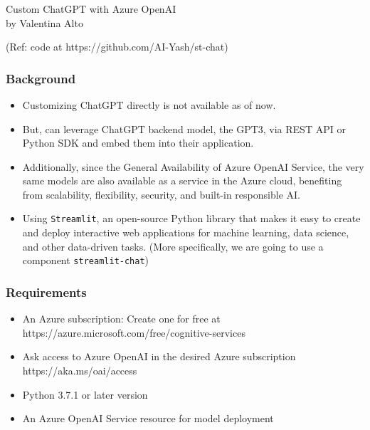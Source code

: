 \begin{frame}[fragile]\frametitle{}
\begin{center}
{\Large Custom ChatGPT with Azure OpenAI \\ by Valentina Alto}

{\tiny (Ref: code at https://github.com/AI-Yash/st-chat)}

\end{center}
\end{frame}

\begin{frame}[fragile]\frametitle{ Background}


\begin{itemize}
\item Customizing ChatGPT directly is not available as of now.
\item But, can leverage ChatGPT backend model, the GPT3, via REST API or Python SDK and embed them into their application.
\item Additionally, since the General Availability of Azure OpenAI Service, the very same models are also available as a service in the Azure cloud, benefiting from scalability, flexibility, security, and built-in responsible AI.
\item Using  \lstinline|Streamlit|, an open-source Python library that makes it easy to create and deploy interactive web applications for machine learning, data science, and other data-driven tasks. (More specifically, we are going to use a component \lstinline|streamlit-chat|)
\end{itemize}	 

\end{frame}

\begin{frame}[fragile]\frametitle{ Requirements}

\begin{itemize}
\item An Azure subscription: Create one for free at https://azure.microsoft.com/free/cognitive-services
\item Ask access to Azure OpenAI in the desired Azure subscription https://aka.ms/oai/access
\item Python 3.7.1 or later version
\item An Azure OpenAI Service resource for model deployment
\end{itemize}	 

\end{frame}

